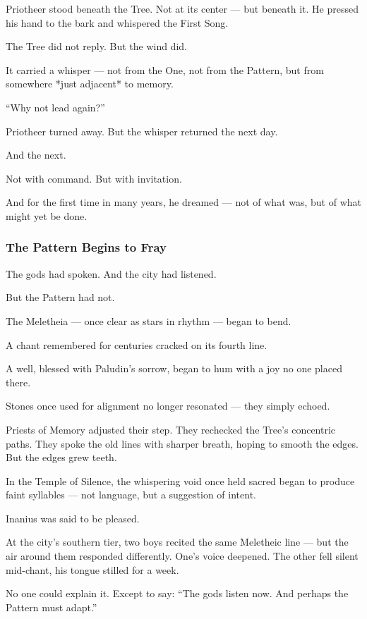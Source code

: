 \documentclass[12pt]{article}
\begin{document}
Priotheer stood beneath the Tree.  
Not at its center — but beneath it.  
He pressed his hand to the bark and whispered the First Song.

The Tree did not reply.  
But the wind did.

It carried a whisper — not from the One,  
not from the Pattern,  
but from somewhere *just adjacent* to memory.

 “Why not lead again?”

Priotheer turned away.  
But the whisper returned the next day.

And the next.

Not with command.  
But with invitation.

And for the first time in many years,  
he dreamed —  
not of what was,  
but of what might yet be done.

\dotfill

\subsubsection*{The Pattern Begins to Fray}

The gods had spoken.  
And the city had listened.

But the Pattern had not.

The Meletheia — once clear as stars in rhythm — began to bend. 

A chant remembered for centuries cracked on its fourth line.  

A well, blessed with Paludin’s sorrow, began to hum with a joy no one placed there.  

Stones once used for alignment no longer resonated — they simply echoed.

Priests of Memory adjusted their step.  
They rechecked the Tree’s concentric paths.  
They spoke the old lines with sharper breath, hoping to smooth the edges.  
But the edges grew teeth.

In the Temple of Silence, the whispering void once held sacred  
began to produce faint syllables —  
not language, but a suggestion of intent.

Inanius was said to be pleased.

At the city’s southern tier, two boys recited the same Meletheic line —  
but the air around them responded differently.  
One’s voice deepened. The other fell silent mid-chant,  
his tongue stilled for a week.

No one could explain it.  
Except to say:  
 “The gods listen now. And perhaps the Pattern must adapt.”
\end{document}
